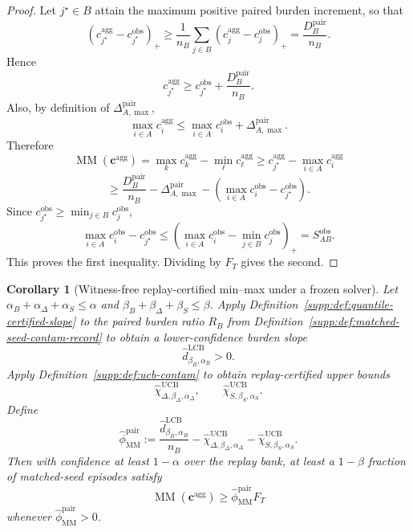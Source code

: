 \documentclass[11pt]{article}
\newcommand{\1}{\mathbf{1}}
\newcommand{\MM}{\operatorname{MM}}
\theoremstyle{definition}
\theoremstyle{plain}
\newtheorem{corollary}[definition]{Corollary}
\theoremstyle{remark}
\begin{document}
\begin{proof}
Let $j^{\star}\in B$ attain the maximum positive paired burden increment, so that
\[
(c_{j^{\star}}^{\mathrm{agg}}-c_{j^{\star}}^{\mathrm{obs}})_+
\ge
\frac{1}{n_B}\sum_{j\in B}(c_j^{\mathrm{agg}}-c_j^{\mathrm{obs}})_+
=
\frac{D_B^{\mathrm{pair}}}{n_B}.
\]
Hence
\[
c_{j^{\star}}^{\mathrm{agg}}
\ge
c_{j^{\star}}^{\mathrm{obs}} + \frac{D_B^{\mathrm{pair}}}{n_B}.
\]
Also, by definition of $\Delta_{A,\max}^{\mathrm{pair}}$,
\[
\max_{i\in A} c_i^{\mathrm{agg}}
\le
\max_{i\in A} c_i^{\mathrm{obs}} + \Delta_{A,\max}^{\mathrm{pair}}.
\]
Therefore
\[
\MM(\mathbf c^{\mathrm{agg}})
=
\max_k c_k^{\mathrm{agg}} - \min_\ell c_\ell^{\mathrm{agg}}
\ge
c_{j^{\star}}^{\mathrm{agg}} - \max_{i\in A} c_i^{\mathrm{agg}}
\]
\[
\ge
\frac{D_B^{\mathrm{pair}}}{n_B}
-
\Delta_{A,\max}^{\mathrm{pair}}
-
\left(\max_{i\in A} c_i^{\mathrm{obs}} - c_{j^{\star}}^{\mathrm{obs}}\right).
\]
Since $c_{j^{\star}}^{\mathrm{obs}}\ge \min_{j\in B} c_j^{\mathrm{obs}}$,
\[
\max_{i\in A} c_i^{\mathrm{obs}} - c_{j^{\star}}^{\mathrm{obs}}
\le
\left(\max_{i\in A} c_i^{\mathrm{obs}} - \min_{j\in B} c_j^{\mathrm{obs}}\right)_+
=
S_{AB}^{\mathrm{obs}}.
\]
This proves the first inequality. Dividing by $F_T$ gives the second.
\end{proof}

\begin{corollary}[Witness-free replay-certified min--max under a frozen solver]
\label{supp:cor:witness-free-minmax}
Let $\alpha_B+\alpha_\Delta+\alpha_S \le \alpha$ and $\beta_B+\beta_\Delta+\beta_S \le \beta$. Apply Definition~\ref{supp:def:quantile-certified-slope} to the paired burden ratio $R_B$ from Definition~\ref{supp:def:matched-seed-contam-record} to obtain a lower-confidence burden slope
\[
\widehat d^{\mathrm{LCB}}_{\beta_B,\alpha_B} > 0.
\]
Apply Definition~\ref{supp:def:ucb-contam} to obtain replay-certified upper bounds
\[
\widehat\chi_{\Delta,\beta_\Delta,\alpha_\Delta}^{\mathrm{UCB}},
\qquad
\widehat\chi_{S,\beta_S,\alpha_S}^{\mathrm{UCB}}.
\]
Define
\[
\widehat\phi_{\MM}^{\mathrm{pair}}
:=
\frac{\widehat d^{\mathrm{LCB}}_{\beta_B,\alpha_B}}{n_B}
-
\widehat\chi_{\Delta,\beta_\Delta,\alpha_\Delta}^{\mathrm{UCB}}
-
\widehat\chi_{S,\beta_S,\alpha_S}^{\mathrm{UCB}}.
\]
Then with confidence at least $1-\alpha$ over the replay bank, at least a $1-\beta$ fraction of matched-seed episodes satisfy
\[
\MM(\mathbf c^{\mathrm{agg}})
\ge
\widehat\phi_{\MM}^{\mathrm{pair}}F_T
\]
whenever $\widehat\phi_{\MM}^{\mathrm{pair}}>0$.
\end{corollary}
\end{document}
